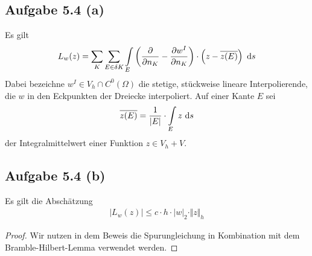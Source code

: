 \documentclass[12pt,a4paper]{article}
\begin{document}
\subsection*{Aufgabe 5.4 (a)}
Es gilt
\begin{align*}
L_w(z)=\sum\limits_K\sum\limits_{E\in\delta K}\int\limits_E\left(\frac{\partial}{\partial n_K}-\frac{\partial w^I}{\partial n_K}\right)\cdot\left(z-\overline{z(E)}\right)\text{ d} s
\end{align*}
Dabei bezeichne $w^I\in V_h\cap C^0(\Omega)$ die stetige, stückweise lineare Interpolierende, die $w$ in den Eckpunkten der Dreiecke interpoliert. Auf einer Kante $E$ sei
\begin{align*}
\overline{z(E)}=\frac{1}{|E|}\cdot\int\limits_E z\text{ d} s
\end{align*}
der Integralmittelwert einer Funktion $z\in V_h+V$.

\subsection*{Aufgabe 5.4 (b)}
Es gilt die Abschätzung
\begin{align*}
\big|L_w(z)\big|\leq c\cdot h\cdot|w|_2\cdot\Vert z\Vert_h
\end{align*}
\begin{proof}
Wir nutzen in dem Beweis die Spurungleichung in Kombination mit dem Bramble-Hilbert-Lemma verwendet werden.
\end{proof}
\end{document}
